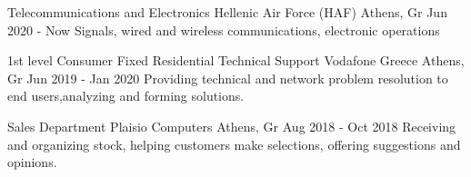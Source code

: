 



\begin{cventries}


    \cventry
    {Telecommunications and Electronics} %
    {Hellenic Air Force (HAF)} %
    {Athens, Gr}%
    {Jun 2020 - Now} %
    {Signals, wired and wireless communications, electronic operations}

    \cventry
    {1st level Consumer Fixed Residential Technical Support} %
    {Vodafone Greece} %
    {Athens, Gr} %
    {Jun 2019 - Jan 2020} %
    {Providing technical and network problem resolution to end users,analyzing and forming solutions.}

    \cventry
    {Sales Department} %
    {Plaisio Computers} %
    {Athens, Gr} %
    {Aug 2018 - Oct 2018} %
    { Receiving and organizing stock, helping customers make selections, offering suggestions and opinions.}


\end{cventries}